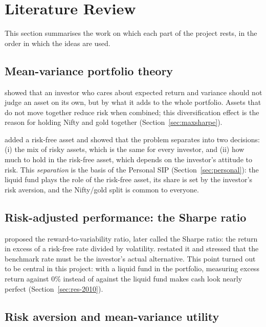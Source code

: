 \section{Literature Review}
\label{ch:lit}

This section summarises the work on which each part of the project rests, in the order in which
the ideas are used.

\subsection{Mean-variance portfolio theory}

\citet{markowitz1952} showed that an investor who cares about expected return and variance should
not judge an asset on its own, but by what it adds to the whole portfolio. Assets that do not
move together reduce risk when combined; this diversification effect is the reason for holding Nifty
and gold together (Section~\ref{sec:maxsharpe}).

\citet{tobin1958} added a risk-free asset and showed that the problem separates into two decisions:
(i) the mix of risky assets, which is the same for every investor, and (ii) how much to hold in the
risk-free asset, which depends on the investor's attitude to risk. This \emph{separation} is the
basis of the Personal SIP (Section~\ref{sec:personal}): the liquid fund plays the role of the
risk-free asset, its share is set by the investor's risk aversion, and the Nifty/gold split is
common to everyone.

\subsection{Risk-adjusted performance: the Sharpe ratio}

\citet{sharpe1966} proposed the reward-to-variability ratio, later called the Sharpe ratio: the
return in excess of a risk-free rate divided by volatility. \citet{sharpe1994} restated it and
stressed that the benchmark rate must be the investor's actual alternative. This point turned out
to be central in this project: with a liquid fund in the portfolio, measuring excess return against
0\% instead of against the liquid fund makes cash look nearly perfect
(Section~\ref{sec:res-2010}).

\subsection{Risk aversion and mean-variance utility}

